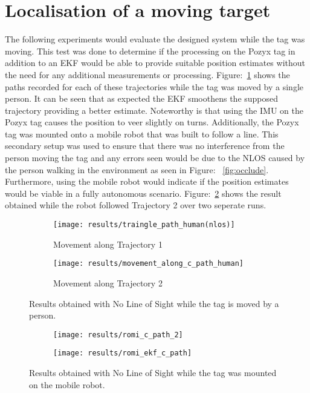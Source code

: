\section{Localisation of a moving target}\label{sec:localisation-of-a-moving-target}
The following experiments would evaluate the designed system while the tag was moving.
This test was done to determine if the processing on the Pozyx tag in addition to an EKF would be able to provide suitable position estimates without the need for any additional measurements or processing.
Figure:~\ref{fig:nlos_ppl} shows the paths recorded for each of these trajectories while the tag was moved by a single person.
It can be seen that as expected the EKF smoothens the supposed trajectory providing a better estimate.
Noteworthy is that using the IMU on the Pozyx tag causes the position to veer slightly on turns.
Additionally, the Pozyx tag was mounted onto a mobile robot that was built to follow a line.
This secondary setup was used to ensure that there was no interference from the person moving the tag and any errors seen would be due to the NLOS caused by the person walking in the environment as seen in Figure: ~\ref{fig:occlude}.
Furthermore, using the mobile robot would indicate if the position estimates would be viable in a fully autonomous scenario.
Figure:~\ref{fig:romi_nlos_1} shows the result obtained while the robot followed Trajectory 2 over two seperate runs.
\begin{figure}[ht!]
    \centering
    \begin{subfigure}{0.7\textwidth}
            \texttt{[image: results/traingle\_path\_human(nlos)]}
            \caption{Movement along Trajectory 1}
    \end{subfigure}
    \begin{subfigure}{0.7\textwidth}
            \texttt{[image: results/movement\_along\_c\_path\_human]}
            \caption{Movement along Trajectory 2}
    \end{subfigure}
    \caption{Results obtained with No Line of Sight while the tag is moved by a person.}
    \label{fig:nlos_ppl}
\end{figure}

\begin{figure}[ht!]
    \centering
    \begin{subfigure}{0.7\textwidth}
            \texttt{[image: results/romi\_c\_path\_2]}
    \end{subfigure}
    \begin{subfigure}{0.7\textwidth}
            \texttt{[image: results/romi\_ekf\_c\_path]}
    \end{subfigure}
    \caption{Results obtained with No Line of Sight while the tag was mounted on the mobile robot.}
    \label{fig:romi_nlos_1}
\end{figure}

